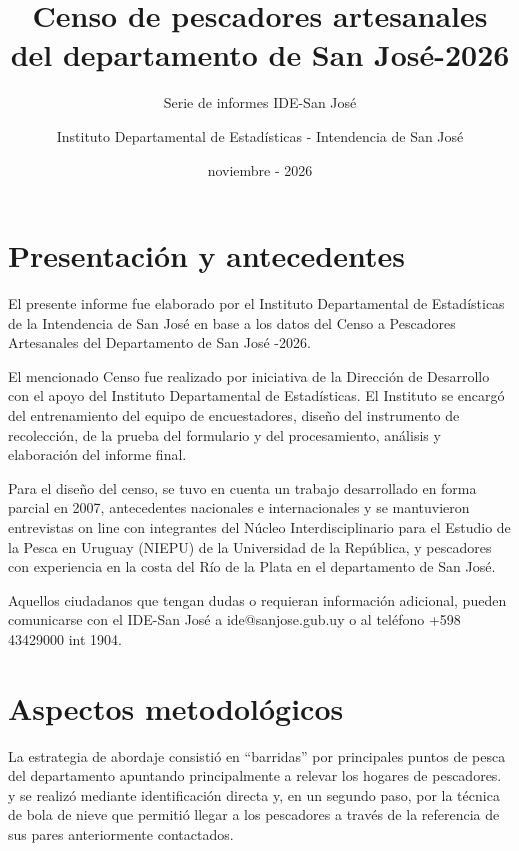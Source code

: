 \documentclass[
  letterpaper,
  DIV=11,
  numbers=noendperiod,
  justified]{scrreprt}
\title{Censo de pescadores artesanales del departamento de San
José-2026}
\subtitle{Serie de informes IDE-San José}
\author{Instituto Departamental de Estadísticas - Intendencia de San
José}
\date{noviembre - 2026}
\renewcommand*\contentsname{Tabla de contenidos}
\newcommand\contentsname{Tabla de contenidos}
\begin{document}
\maketitle
\ifdefined\Shaded\renewenvironment{Shaded}{\begin{tcolorbox}[breakable, interior hidden, borderline west={3pt}{0pt}{shadecolor}, enhanced, sharp corners, frame hidden, boxrule=0pt]}{\end{tcolorbox}}\fi

\renewcommand*\contentsname{Tabla de contenidos}
{
\hypersetup{linkcolor=}
\setcounter{tocdepth}{2}
\tableofcontents
}
\hypertarget{presentaciuxf3n-y-antecedentes}{%
\chapter{Presentación y
antecedentes}\label{presentaciuxf3n-y-antecedentes}}

El presente informe fue elaborado por el Instituto Departamental de
Estadísticas de la Intendencia de San José en base a los datos del Censo
a Pescadores Artesanales del Departamento de San José -2026.

El mencionado Censo fue realizado por iniciativa de la Dirección de
Desarrollo con el apoyo del Instituto Departamental de Estadísticas. El
Instituto se encargó del entrenamiento del equipo de encuestadores,
diseño del instrumento de recolección, de la prueba del formulario y del
procesamiento, análisis y elaboración del informe final.

Para el diseño del censo, se tuvo en cuenta un trabajo desarrollado en
forma parcial en 2007, antecedentes nacionales e internacionales y se
mantuvieron entrevistas on line con integrantes del Núcleo
Interdisciplinario para el Estudio de la Pesca en Uruguay (NIEPU) de la
Universidad de la República, y pescadores con experiencia en la costa
del Río de la Plata en el departamento de San José.

Aquellos ciudadanos que tengan dudas o requieran información adicional,
pueden comunicarse con el IDE-San José a ide@sanjose.gub.uy o al
teléfono +598 43429000 int 1904.

\newpage

\hypertarget{aspectos-metodoluxf3gicos}{%
\chapter{Aspectos metodológicos}\label{aspectos-metodoluxf3gicos}}

La estrategia de abordaje consistió en ``barridas'' por principales
puntos de pesca del departamento apuntando principalmente a relevar los
hogares de pescadores. y se realizó mediante identificación directa y,
en un segundo paso, por la técnica de bola de nieve que permitió llegar
a los pescadores a través de la referencia de sus pares anteriormente
contactados.
\end{document}

